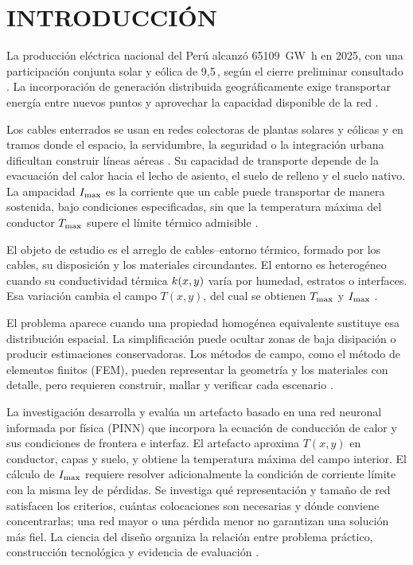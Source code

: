 \chapter*{INTRODUCCIÓN}
\thispagestyle{empty}

La producción eléctrica nacional del Perú alcanzó \SI{65109}{\giga\watt\hour} en 2025, con una participación conjunta solar y eólica de 9,5\,\pct{}, según el cierre preliminar consultado \parencite[cuadro~4]{minem2025indicadoresDiciembre}. La incorporación de generación distribuida geográficamente exige transportar energía entre nuevos puntos y aprovechar la capacidad disponible de la red \parencite{iea2025transmissiongrid}.

Los cables enterrados se usan en redes colectoras de plantas solares y eólicas y en tramos donde el espacio, la servidumbre, la seguridad o la integración urbana dificultan construir líneas aéreas \parencite{cigre2023overheadLines}. Su capacidad de transporte depende de la evacuación del calor hacia el lecho de asiento, el suelo de relleno y el suelo nativo. La ampacidad $I_{\max}$ es la corriente que un cable puede transportar de manera sostenida, bajo condiciones especificadas, sin que la temperatura máxima del conductor $T_{\max}$ supere el límite térmico admisible \parencites[cláusulas~4--5]{iec60287}[3--5]{enescu2020}.

El objeto de estudio es el arreglo de cables--entorno térmico, formado por los cables, su disposición y los materiales circundantes. El entorno es heterogéneo cuando su conductividad térmica $k(x,y)$ varía por humedad, estratos o interfaces. Esa variación cambia el campo $T(x,y)$, del cual se obtienen $T_{\max}$ y $I_{\max}$ \parencites[3--4]{enescu2021}[1,6--7]{khumalo2025}[3]{xing2023}.

El problema aparece cuando una propiedad homogénea equivalente sustituye esa distribución espacial. La simplificación puede ocultar zonas de baja disipación o producir estimaciones conservadoras. Los métodos de campo, como el método de elementos finitos (FEM), pueden representar la geometría y los materiales con detalle, pero requieren construir, mallar y verificar cada escenario \parencites[41--42,93--99]{cigre2025}[1--3,12]{aldulaimi2024}.

La investigación desarrolla y evalúa un artefacto basado en una red neuronal informada por física (PINN) que incorpora la ecuación de conducción de calor y sus condiciones de frontera e interfaz. El artefacto aproxima $T(x,y)$ en conductor, capas y suelo, y obtiene la temperatura máxima del campo interior. El cálculo de $I_{\max}$ requiere resolver adicionalmente la condición de corriente límite con la misma ley de pérdidas. Se investiga qué representación y tamaño de red satisfacen los criterios, cuántas colocaciones son necesarias y dónde conviene concentrarlas; una red mayor o una pérdida menor no garantizan una solución más fiel. La ciencia del diseño organiza la relación entre problema práctico, construcción tecnológica y evidencia de evaluación \parencites[54--56]{peffers2007}[342--350]{gregor2013}.

